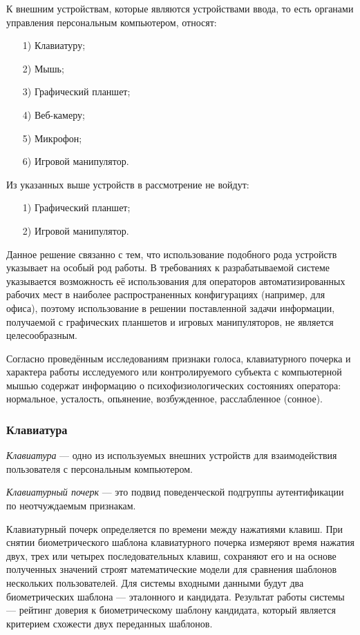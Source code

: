 К внешним устройствам, которые являются устройствами ввода, то есть органами управления персональным компьютером, относят:
\begin{itemize}[leftmargin=1.6\parindent]
\item[1)] Клавиатуру;
\item[2)] Мышь;
\item[3)] Графический планшет;
\item[4)] Веб-камеру;
\item[5)] Микрофон;
\item[6)] Игровой манипулятор.
\end{itemize}

Из указанных выше устройств в рассмотрение не войдут:
\begin{itemize}[leftmargin=1.6\parindent]
\item[1)] Графический планшет;
\item[2)] Игровой манипулятор.
\end{itemize}

Данное решение связанно с тем, что использование подобного рода устройств указывает на особый род работы. В требованиях к разрабатываемой системе указывается возможность её использования для операторов автоматизированных рабочих мест в наиболее распространенных  конфигурациях (например, для офиса), поэтому использование в решении поставленной задачи информации, получаемой с графических планшетов и игровых манипуляторов, не является целесообразным.

Согласно проведённым исследованиям \cite{recognitionOfPsycho} признаки голоса, клавиатурного почерка и характера работы исследуемого или контролируемого субъекта с компьютерной мышью содержат информацию о психофизиологических состояниях оператора: нормальное, усталость, опьянение, возбужденное, расслабленное (сонное).

\subsubsection{Клавиатура}
\textit{Клавиатура} --- одно из используемых внешних устройств для взаимодействия пользователя с персональным компьютером.

\textit{Клавиатурный почерк} --- это подвид поведенческой подгруппы аутентификации по неотчуждаемым признакам. \cite{keystroke}

Клавиатурный почерк определяется по времени между нажатиями клавиш. При снятии биометрического шаблона клавиатурного почерка измеряют время нажатия двух, трех или четырех последовательных клавиш, сохраняют его и на основе полученных значений строят математические модели для сравнения шаблонов нескольких пользователей. \cite{intrusionDetection} Для системы входными данными будут два биометрических шаблона --- эталонного и кандидата. Результат работы системы --- рейтинг доверия к биометрическому шаблону кандидата, который является критерием схожести двух переданных шаблонов.


